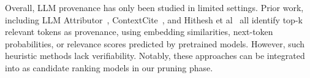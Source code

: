  


Overall, LLM provenance has only been studied in limited settings. Prior work, including
LLM Attributor~\cite{lee2025llm},  ContextCite~\cite{cohen2024contextcite}, and Hithesh et al~\cite{sankararaman2024provenance} all identify top-k relevant tokens as provenance, using embedding similarities, next-token probabilities, or relevance scores predicted by pretrained models. However, such heuristic methods lack verifiability. %
Notably, these approaches can be integrated into \sys as candidate ranking models in our pruning phase.  
